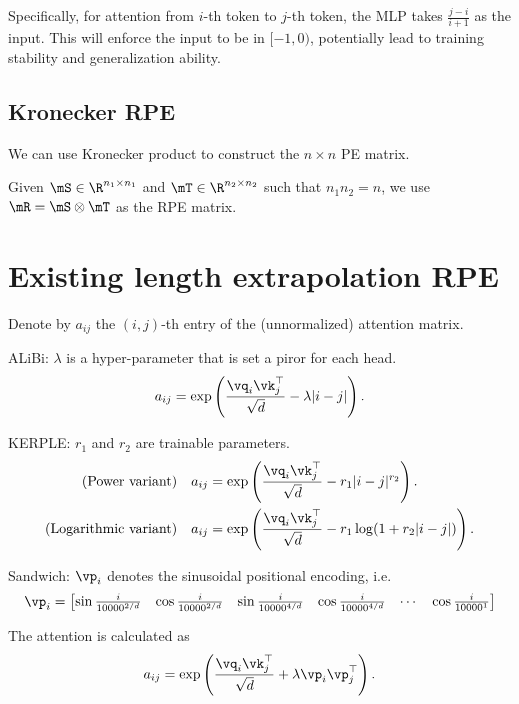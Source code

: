 Specifically, for attention from $i$-th token to $j$-th token, the MLP takes $\frac{j-i}{i+1}$ as the input. This will enforce the input to be in $[-1, 0)$, potentially lead to training stability and generalization ability.

\subsection{Kronecker RPE}
We can use Kronecker product to construct the $n \times n$ PE matrix. 

Given $\mS\in\R^{n_1\times n_1}$ and $\mT\in\R^{n_2\times n_2}$ such that $n_1n_2=n$, we use $\mR = \mS\otimes \mT$ as the RPE matrix.

\section{Existing length extrapolation RPE}
Denote by $a_{ij}$ the $(i, j)$-th entry of the (unnormalized) attention matrix.

ALiBi: $\lambda$ is a hyper-parameter that is set a piror for each head.
\begin{equation*}
    a_{ij} = \exp\left(\frac{\vq_i\vk_j^{\top}}{\sqrt{d}}-\lambda |i-j|\right).
\end{equation*}

KERPLE: $r_1$ and $r_2$ are trainable parameters.
\begin{align*}
    \text{(Power variant)} & \quad a_{ij} = \exp\left(\frac{\vq_i\vk_j^{\top}}{\sqrt{d}}-r_1 |i-j|^{r_2}\right). \\ 
    \text{(Logarithmic variant)} & \quad a_{ij} = \exp\left(\frac{\vq_i\vk_j^{\top}}{\sqrt{d}}-r_1 \log(1+r_2|i-j|)\right). 
\end{align*}

Sandwich: $\vp_i$ denotes the sinusoidal positional encoding, i.e.
\begin{equation*}
    \vp_i = \begin{bmatrix}
        \sin \frac{i}{10000^{2/d}}& \cos \frac{i}{10000^{2/d}} &\sin \frac{i}{10000^{4/d}}& \cos \frac{i}{10000^{4/d}} & \cdots & \cos \frac{i}{10000^{1}}
    \end{bmatrix}
\end{equation*}

The attention is calculated as
\begin{equation*}
    a_{ij} = \exp\left(\frac{\vq_i\vk_j^{\top}}{\sqrt{d}}+\lambda\vp_i \vp_j^{\top}\right).
\end{equation*}

